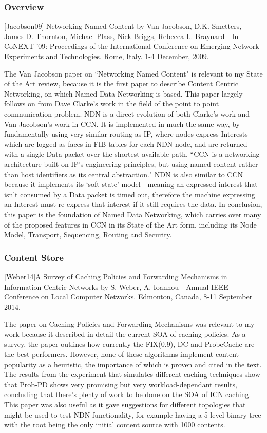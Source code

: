 \subsubsection{Overview}
[Jacobson09] Networking Named Content by Van Jacobson, D.K. Smetters, James D. Thornton, Michael Plass, Nick Briggs, Rebecca L. Braynard - In CoNEXT '09: Proceedings of the  International Conference on Emerging Network Experiments and Technologies. Rome, Italy. 1-4 December, 2009.

The Van Jacobson paper on ``Networking Named Content" is relevant to my State of the Art review, because it is the first paper to describe Content Centric Networking, on which Named Data Networking is based. This paper largely follows on from Dave Clarke's work in the field of the point to point communication problem. NDN is a direct evolution of both Clarke's work and Van Jacobson's work in CCN. It is implemented in much the same way, by fundamentally using very similar routing as IP, where nodes express Interests which are logged as faces in FIB tables for each NDN node, and are returned with a single Data packet over the shortest available path. ``CCN is a networking architecture built on IP's engineering principles, but using named content rather than host identifiers as its central abstraction." NDN is also similar to CCN because it implements its `soft state' model - meaning an expressed interest that isn't consumed by  a Data packet is timed out, therefore the machine expressing an Interest must re-express that interest if it still requires the data. In conclusion, this paper is the foundation of Named Data Networking, which carries over many of the proposed features in CCN in its State of the Art form, including its Node Model, Transport, Sequencing, Routing and Security.


\subsubsection{Content Store}
[Weber14]A Survey of Caching Policies and Forwarding Mechanisms in Information-Centric Networks by S. Weber, A. Ioannou -  Annual IEEE Conference on Local Computer Networks. Edmonton, Canada, 8-11 September 2014.

The paper on Caching Policies and Forwarding Mechanisms was relevant to my work because it described in detail the current SOA of caching policies. As a survey, the paper outlines how currently the FIX(0.9), DC and ProbeCache are the best performers. However, none of these algorithms implement content popularity as a heuristic, the importance of which is proven and cited in the text. The results from the experiment that simulates different caching techniques show that Prob-PD shows very promising but very workload-dependant results, concluding that there’s plenty of work to be done on the SOA of ICN caching. This paper was also useful as it gave suggestions for different topologies that might be used to test NDN functionality, for example having a 5 level binary tree with the root being the only initial content source with 1000 contents. 
\\


